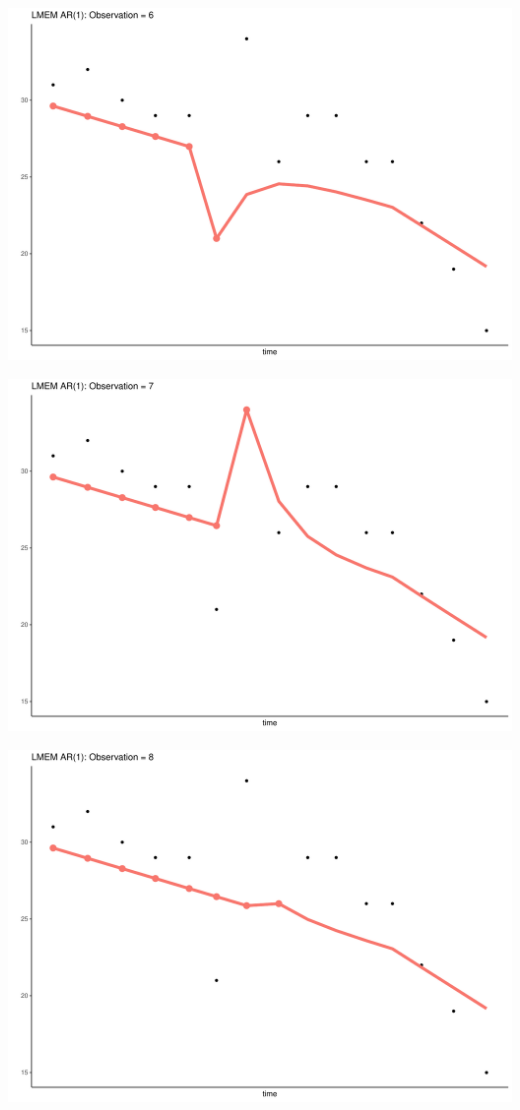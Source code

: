 \documentclass[
  ignorenonframetext,
]{beamer}
\begin{document}
\begin{frame}{}
\protect\hypertarget{section-20}{}
\includegraphics{Prez4_files/figure-beamer/unnamed-chunk-14-6.pdf}
\end{frame}

\begin{frame}{}
\protect\hypertarget{section-21}{}
\includegraphics{Prez4_files/figure-beamer/unnamed-chunk-14-7.pdf}
\end{frame}

\begin{frame}{}
\protect\hypertarget{section-22}{}
\includegraphics{Prez4_files/figure-beamer/unnamed-chunk-14-8.pdf}
\end{frame}
\end{document}
